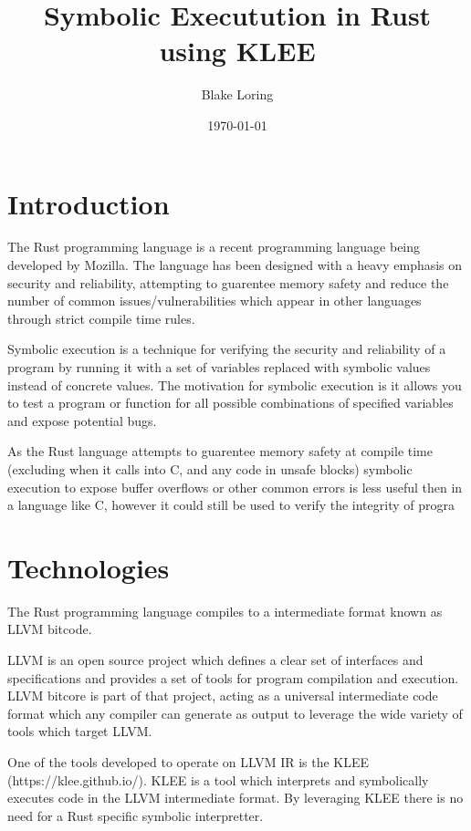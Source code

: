 \documentclass{report}
\begin{document}
\usepackage{listings}

\title{Symbolic Executution in Rust using KLEE}
\author{Blake Loring}
\date{\today}

\maketitle

\chapter {Introduction}

The Rust programming language is a recent programming language being developed by Mozilla. The language has been designed with a heavy emphasis on security and reliability, attempting to guarentee memory safety and reduce the number of common issues/vulnerabilities which appear in other languages through strict compile time rules.

Symbolic execution is a technique for verifying the security and reliability of a program by running it with a set of variables replaced with symbolic values instead of concrete values. The motivation for symbolic execution is it allows you to test a program or function for all possible combinations of specified variables and expose potential bugs.

As the Rust language attempts to guarentee memory safety at compile time (excluding when it calls into C, and any code in unsafe blocks) symbolic execution to expose buffer overflows or other common errors is less useful then in a language like C, however it could still be used to verify the integrity of progra

\chapter {Technologies}

The Rust programming language compiles to a intermediate format known as LLVM bitcode.

LLVM is an open source project which defines a clear set of interfaces and specifications and provides a set of tools for program compilation and execution. LLVM bitcore is part of that project, acting as a universal intermediate code format which any compiler can generate as output to leverage the wide variety of tools which target LLVM.

One of the tools developed to operate on LLVM IR is the KLEE (https://klee.github.io/). KLEE is a tool which interprets and symbolically executes code in the LLVM intermediate format. By leveraging KLEE there is no need for a Rust specific symbolic interpretter.
\end{document}
